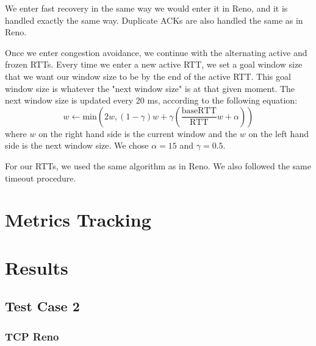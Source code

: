 \documentclass{article}
\begin{document}
We enter fast recovery in the same way we would enter it in Reno, and it is handled exactly the same way. Duplicate ACKs are also handled the same as in Reno.

Once we enter congestion avoidance, we continue with the alternating active and frozen RTTs. Every time we enter a new active RTT, we set a goal window size that we want our window size to be by the end of the active RTT. This goal window size is whatever the "next window size" is at that given moment. The next window size is updated every 20 ms, according to the following equation: $$ w \leftarrow \textrm{min}(2w, (1-\gamma)w + \gamma(\frac{\textrm{baseRTT}}{\textrm{RTT}}w + \alpha)) $$
where $w$ on the right hand side is the current window and the $w$ on the left hand side is the next window size. We chose $\alpha = 15$ and $\gamma = 0.5$. 

For our RTTs, we used the same algorithm as in Reno. We also followed the same timeout procedure.


\section{Metrics Tracking}

\section{Results}


\subsection{Test Case 2}

\subsubsection{TCP Reno}
\end{document}
